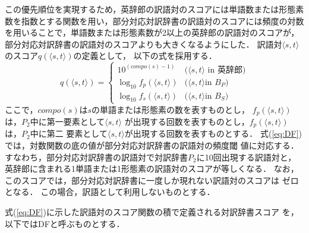 \documentclass[japanese]{jnlp_1.3a}
\begin{document}
この優先順位を実現するため，英辞郎の訳語対のスコアには単語数または形態素
数を指数とする関数を用い，部分対応対訳辞書の訳語対のスコアには頻度の対数
を用いることで，単語数または形態素数が2以上の英辞郎の訳語対のスコアが，
部分対応対訳辞書の訳語対のスコアよりも大きくなるようにした．
訳語対$\langle s,t\rangle$のスコア$q(\langle s,t\rangle)$の定義として，
以下の式を採用する．
\begin{equation}
 \label{eq:DF}
 q(\langle s,t\rangle) =
 \left\{ \begin{array}{ll}
  10^{(compo(s)-1)} & \mbox{($\langle s,t\rangle$ in 英辞郎)}\\
	  \log_{10}f_p(\langle s,t\rangle) & \mbox{($\langle s,t\rangle$
	   in } B_P \mbox{)}\\
	  \log_{10}f_s(\langle s,t\rangle) & \mbox{($\langle s,t\rangle$
	   in } B_S \mbox{)}
	 \end{array} \right.
\end{equation}
ここで，$compo(s)$は$s$の単語または形態素の数を表すものとし，
$f_p(\langle s,t\rangle)$は，$P_2$中に第一要素として$\langle s,t\rangle$
が出現する回数を表すものとし，$f_p(\langle s,t\rangle)$は，$P_2$中に第二
要素として$\langle s,t\rangle$が出現する回数を表すものとする．
式(\ref{eq:DF})では，対数関数の底の値が部分対応対訳辞書の訳語対の頻度閾
値に対応する．
すなわち，部分対応対訳辞書の訳語対で対訳辞書$P_2$に10回出現する訳語対と，
英辞郎に含まれる1単語または1形態素の訳語対のスコアが等しくなる．
なお，このスコアでは，部分対応対訳辞書に一度しか現れない訳語対のスコアは
ゼロとなる．
この場合，訳語として利用しないものとする．


式(\ref{eq:DF})に示した訳語対のスコア関数の積で定義される対訳辞書スコア
を，以下ではDFと呼ぶものとする．
\end{document}
